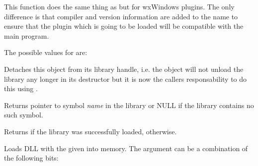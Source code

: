 \label{wxdynamiclibrarycanonicalizepluginname}


This function does the same thing as 
 but for wxWindows
plugins. The only difference is that compiler and version information are added
to the name to ensure that the plugin which is going to be loaded will be
compatible with the main program.

The possible values for  are:
\begin{twocollist}
\end{twocollist}


\label{wxdynamiclibrarydetach}


Detaches this object from its library handle, i.e. the object will not unload
the library any longer in its destructor but it is now the callers
responsability to do this using .


\label{wxdynamiclibrarygetsymbol}


Returns pointer to symbol {\it name} in the library or NULL if the library
contains no such symbol.




\label{wxdynamiclibraryisloaded}


Returns \true if the library was successfully loaded, \false otherwise.


\label{wxdynamiclibraryload}


Loads DLL with the given  into memory. The  argument can
be a combination of the following bits:
\begin{twocollist}
\end{twocollist}


